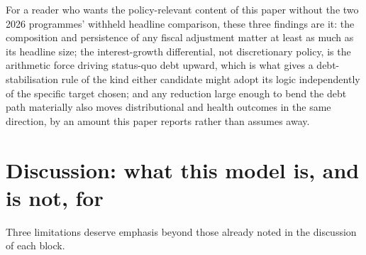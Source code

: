 \documentclass[11pt,a4paper]{article}
\begin{document}
For a reader who wants the policy-relevant content of this paper without the two 2026 programmes' withheld headline comparison, these three findings are it: the composition and persistence of any fiscal adjustment matter at least as much as its headline size; the interest-growth differential, not discretionary policy, is the arithmetic force driving status-quo debt upward, which is what gives a debt-stabilisation rule of the kind either candidate might adopt its logic independently of the specific target chosen; and any reduction large enough to bend the debt path materially also moves distributional and health outcomes in the same direction, by an amount this paper reports rather than assumes away.

\section{Discussion: what this model is, and is not, for}
\label{sec:discussion}

Three limitations deserve emphasis beyond those already noted in the discussion of each block.
\end{document}
